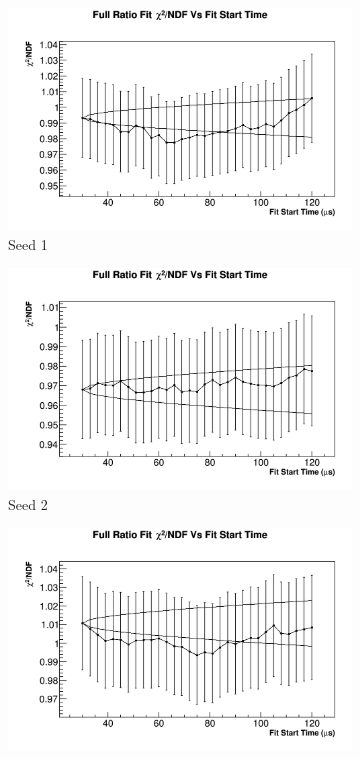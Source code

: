 		\begin{figure}[]
		\centering
		    \begin{subfigure}[t]{0.45\textwidth}
			    \centering
				\includegraphics[width=\textwidth]{RatioCBO_Chi2NDF_Vs_FS_canv-Seed0}
			    \caption{Seed 1}
		    \end{subfigure}
		    \begin{subfigure}[t]{0.45\textwidth}
			    \centering
				\includegraphics[width=\textwidth]{RatioCBO_Chi2NDF_Vs_FS_canv-Seed5}
			    \caption{Seed 2}
		    \end{subfigure}%
		    \vspace{4mm}
		    \begin{subfigure}[t]{0.45\textwidth}
			    \centering
				\includegraphics[width=\textwidth]{RatioCBO_Chi2NDF_Vs_FS_canv-Seed12}

\end{subfigure}
\end{figure}
